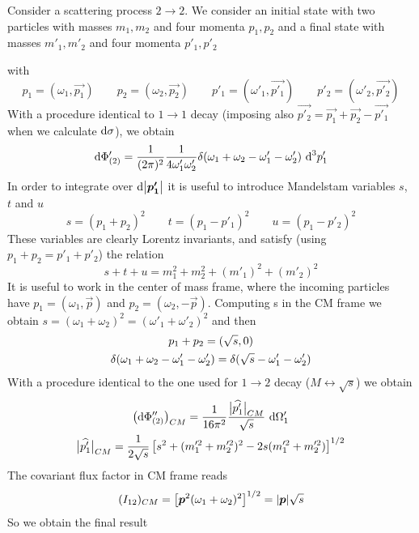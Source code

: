 \documentclass[TheoreticalPhy_ModB.tex]{subfiles}
\begin{document}
\begin{example}[$2 \to 2$ scattering]
Consider a scattering process $2 \to 2$. We consider an initial state with two particles with masses $m_1, m_2$ and four momenta $p_1, p_2$ and a final state with masses $m'_1, m'_2$ and four momenta $p'_1, p'_2$

\begin{center}

\end{center}
%
with
\[
p_1 = (\omega_1, \vec{p_1}) \qquad
p_2 = (\omega_2, \vec{p_2}) \qquad
p'_1 = (\omega'_1, \vec{p'_1}) \qquad
p'_2 = (\omega'_2, \vec{p'_2})
\]
With a procedure identical to $1 \to 1$ decay (imposing also $\vec{p'_2} = \vec{p_1} + \vec{p_2} - \vec{p'_1}$ when we calculate $\textup{d} \sigma$), we obtain 
\[
\textup{d} \Phi'_{(2)} = \frac{1}{(2 \pi)^2} \frac{1}{4 \omega'_1 \omega'_2} \delta (\omega_1 + \omega_2 - \omega'_1 - \omega'_2) \ \textup{d}^3p'_1
\]
In order to integrate over $\textup{d} \abs{\boldsymbol{p'_1}}$ it is useful to introduce Mandelstam variables $s$, $t$ and $u$
\[
s = (p_1 + p_2)^2 \qquad
t = (p_1 - p'_1)^2 \qquad
u = (p_1 - p'_2)^2
\]
These variables are clearly Lorentz invariants, and satisfy (using $p_1 + p_2 = p'_1 + p'_2$) the relation
\[
s + t + u = m_1^2 + m_2^2 + (m'_1)^2 + (m'_2)^2
\]
It is useful to work in the center of mass frame, where the incoming particles have $p_1 = (\omega_1, \vec{p})$ and $p_2 = (\omega_2, -\vec{p})$. Computing s in the CM frame we obtain $s = (\omega_1 + \omega_2)^2 = (\omega'_1 + \omega'_2)^2$ and then
\begin{gather}
p_1 + p_2 = (\sqrt{s}, 0) \notag \\
\delta(\omega_1 + \omega_2 - \omega'_1 -\omega'_2) = \delta (\sqrt{s} - \omega'_1 - \omega'_2) \notag
\end{gather}
With a procedure identical to the one used for $1 \to 2$ decay ($M \leftrightarrow \sqrt{s}$) we obtain
\begin{gather}
\bigl( \textup{d} \Phi''_{(2)} \bigr)_{CM} = \frac{1}{16 \pi^2} \frac{\big\vert{\widehat{p'_1}}\big\vert_{CM}}{\sqrt{s}} \ \textup{d} \Omega'_1 \notag \\
\big\vert{\widehat{p'_1}}\big\vert_{CM} = \frac{1}{2 \sqrt{s}} \left[ s^2 + (m^{\prime 2}_1 + m^{\prime 2}_2)^2 - 2s (m^{\prime 2}_1 + m^{\prime 2}_2) \right]^{1/2} \notag
\end{gather}
The covariant flux factor in CM frame reads
\[
(I_{12})_{CM} = \left[ \boldsymbol{p}^2 (\omega_1 + \omega_2 )^2 \right]^{1/2} = \abs{\boldsymbol{p}} \sqrt{s}
\]
So we obtain the final result
\[
\begin{split}

\end{split}\]
\end{example}
\end{document}
